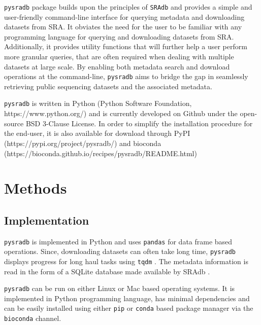 \documentclass[9pt,a4paper]{extarticle}
\begin{document}
\texttt{pysradb} package builds upon the principles of \texttt{SRAdb} and 
provides a simple and user-friendly command-line interface for querying metadata and downloading
datasets from SRA. It obviates the need for the
user to be familiar with any programming language for querying and
downloading datasets from SRA. Additionally, it provides utility 
functions that will further help a user perform more granular queries, that
are often required when dealing with multiple datasets at large scale. By enabling both metadata
search and download operations at the command-line, \texttt{pysradb} aims to bridge the gap in
seamlessly retrieving public sequencing datasets and the associated metadata.

\texttt{pysradb} is written in Python (Python Software Foundation, 
https://www.python.org/) \cite{vanRossum:2011:PLR:2011965} and is currently developed
on Github under the open-source BSD 3-Clause License. In order to simplify the installation
procedure for the end-user, it is also available for download through PyPI (https://pypi.org/project/pysradb/)
and bioconda \cite{gruning2018bioconda} (https://bioconda.github.io/recipes/pysradb/README.html)

\section*{Methods}

\subsection*{Implementation}
\texttt{pysradb} is implemented in Python and uses
\texttt{pandas} \cite{mckinney-proc-scipy-2010} for data frame based operations. 
Since, downloading datasets can often take long time, \texttt{pysradb} displays 
progress for long haul tasks using \texttt{tqdm}
\cite{casper_da_costa_luis_2018_1211527}. The metadata information is read in the
form of a SQLite \cite{about_sqlite} database made available by SRAdb
\cite{zhu2013sradb}. 

\texttt{pysradb} can be run on either Linux or Mac based operating systems. It
is implemented in Python programming language, has minimal dependencies and can
be easily installed using either \texttt{pip} or \texttt{conda} based package
manager via the \texttt{bioconda} \cite{gruning2018bioconda} channel. 
\end{document}
